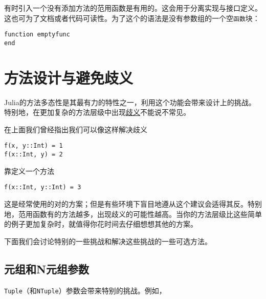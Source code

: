 有时引入一个没有添加方法的范用函数是有用的。这会用于分离实现与接口定义。这也可为了文档或者代码可读性。为了这个的语法是没有参数组的一个空\texttt{函数}块：




\begin{verbatim}
function emptyfunc
end
\end{verbatim}



\hypertarget{11088607530909626670}{}


\section{方法设计与避免歧义}



Julia的方法多态性是其最有力的特性之一，利用这个功能会带来设计上的挑战。特别地，在更加复杂的方法层级中出现\hyperlink{1524461975045594238}{歧义}不能说不常见。



在上面我们曾经指出我们可以像这样解决歧义




\begin{verbatim}
f(x, y::Int) = 1
f(x::Int, y) = 2
\end{verbatim}



靠定义一个方法




\begin{verbatim}
f(x::Int, y::Int) = 3
\end{verbatim}



这是经常使用的对的方案；但是有些环境下盲目地遵从这个建议会适得其反。特别地，范用函数有的方法越多，出现歧义的可能性越高。当你的方法层级比这些简单的例子更加复杂时，就值得你花时间去仔细想想其他的方案。



下面我们会讨论特别的一些挑战和解决这些挑战的一些可选方法。



\hypertarget{17193104641044635373}{}


\subsection{元组和N元组参数}



\texttt{Tuple}（和\texttt{NTuple}）参数会带来特别的挑战。例如，




